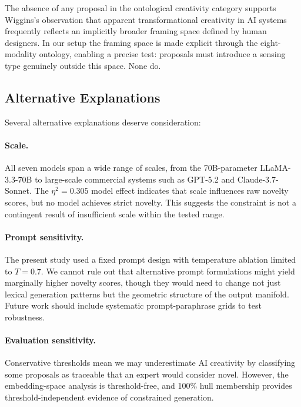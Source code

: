 \documentclass[pdflatex,sn-mathphys-num]{sn-jnl}
\begin{document}
The absence of any proposal in the ontological creativity category supports Wiggins's
\cite{wiggins2006preliminary} observation that apparent transformational creativity in AI systems
frequently reflects an implicitly broader framing space defined by human designers.  In our
setup the framing space is made explicit through the eight-modality ontology, enabling a precise
test: proposals must introduce a sensing type genuinely outside this space.  None do.

\subsection{Alternative Explanations}

Several alternative explanations deserve consideration:

\paragraph{Scale.}  All seven models span a wide range of scales, from the 70B-parameter
LLaMA-3.3-70B to large-scale commercial systems such as GPT-5.2 and Claude-3.7-Sonnet.  The
$\eta^{2} = 0.305$ model effect indicates that scale influences raw novelty scores, but no model
achieves strict novelty.  This suggests the constraint is not a contingent result of insufficient
scale within the tested range.

\paragraph{Prompt sensitivity.}  The present study used a fixed prompt design with
temperature ablation limited to $T=0.7$.  We cannot rule out that alternative prompt formulations
might yield marginally higher novelty scores, though they would need to change not just lexical
generation patterns but the geometric structure of the output manifold.  Future work should
include systematic prompt-paraphrase grids to test robustness.

\paragraph{Evaluation sensitivity.}  Conservative thresholds mean we may underestimate AI
creativity by classifying some proposals as traceable that an expert would consider novel.
However, the embedding-space analysis is threshold-free, and 100\% hull membership provides
threshold-independent evidence of constrained generation.
\end{document}
